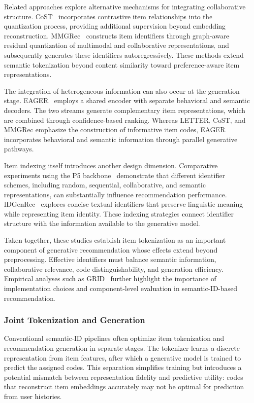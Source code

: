\documentclass[sigconf,nonacm]{acmart}
\begin{document}
Related approaches explore alternative mechanisms
for integrating collaborative structure.
CoST~\cite{cost} incorporates contrastive item
relationships into the quantization process,
providing additional supervision beyond embedding
reconstruction. MMGRec~\cite{mmgrec} constructs
item identifiers through graph-aware residual
quantization of multimodal and collaborative
representations, and subsequently generates these
identifiers autoregressively. These methods extend
semantic tokenization beyond content similarity
toward preference-aware item representations.

The integration of heterogeneous information can
also occur at the generation stage. EAGER~\cite{eager}
employs a shared encoder with separate behavioral
and semantic decoders. The two streams generate
complementary item representations, which are
combined through confidence-based ranking. Whereas
LETTER, CoST, and MMGRec emphasize the construction
of informative item codes, EAGER incorporates
behavioral and semantic information through
parallel generative pathways.

Item indexing itself introduces another design
dimension. Comparative experiments using the P5
backbone~\cite{indexids} demonstrate that different
identifier schemes, including random, sequential,
collaborative, and semantic representations, can
substantially influence recommendation performance.
IDGenRec~\cite{idgenrec} explores concise textual
identifiers that preserve linguistic meaning while
representing item identity. These indexing strategies
connect identifier structure with the information
available to the generative model.

Taken together, these studies establish item
tokenization as an important component of
generative recommendation whose effects extend
beyond preprocessing. Effective identifiers
must balance semantic information, collaborative
relevance, code distinguishability, and generation
efficiency. Empirical analyses such as
GRID~\cite{grid} further highlight the importance
of implementation choices and component-level
evaluation in semantic-ID-based recommendation.

\subsubsection{Joint Tokenization and Generation}

Conventional semantic-ID pipelines often optimize
item tokenization and recommendation generation
in separate stages. The tokenizer learns a discrete
representation from item features, after which a
generative model is trained to predict the assigned
codes. This separation simplifies training but
introduces a potential mismatch between
representation fidelity and predictive utility:
codes that reconstruct item embeddings accurately
may not be optimal for prediction from user histories.
\end{document}

